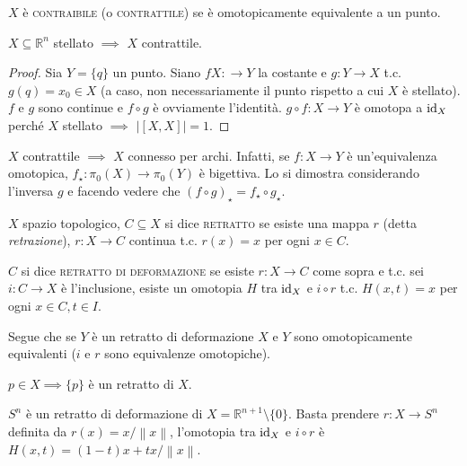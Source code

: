 \begin{defn}
  $X$ è \textsc{contraibile} (o \textsc{contrattile}) se è omotopicamente equivalente a un punto.
\end{defn}

\begin{prop}
  $X \subseteq \mathbb{R}^n$ stellato $\implies$ $X$ contrattile.
\end{prop}

\begin{proof}
  Sia $Y=\{q\}$ un punto. Siano $fX: \rightarrow Y$ la costante e $g:Y \rightarrow X$ t.c. $g(q)=x_0 \in X$ (a caso, non necessariamente il punto rispetto a cui $X$ è stellato). $f$ e $g$ sono continue e $f \circ g$ è ovviamente l'identità. $g \circ f:X \rightarrow Y$ è omotopa a $\operatorname{id}_X$ perché $X$ stellato $\implies$ $\left|[X, X]\right|=1$.
\end{proof}

\begin{oss}
  $X$ contrattile $\implies$ $X$ connesso per archi. Infatti, se $f:X \rightarrow Y$ è un'equivalenza omotopica, $f_{\star}: \pi_0(X) \rightarrow \pi_0(Y)$ è bigettiva. Lo si dimostra considerando l'inversa $g$ e facendo vedere che $(f \circ g)_{\star}=f_{\star} \circ g_{\star}$.
\end{oss}

\begin{defn}
  $X$ spazio topologico, $C \subseteq X$ si dice \textsc{retratto} se esiste una mappa $r$ (detta \textit{retrazione}), $r:X \rightarrow C$ continua t.c. $r(x)=x$ per ogni $x \in C$.

  $C$ si dice \textsc{retratto di deformazione} se esiste $r:X \rightarrow C$ come sopra e t.c. sei $i:C \rightarrow X$ è l'inclusione, esiste un omotopia $H$ tra $\operatorname{id}_X$ e $i \circ r$ t.c. $H(x, t)=x$ per ogni $x \in C, t \in I$.
\end{defn}

Segue che se $Y$ è un retratto di deformazione $X$ e $Y$ sono omotopicamente equivalenti ($i$ e $r$ sono equivalenze omotopiche).

\begin{ex}
  $p \in X \implies \{p\}$ è un retratto di $X$.
\end{ex}

\begin{ex}
  $S^n$ è un retratto di deformazione di $X=\mathbb{R}^{n+1} \setminus \{0\}$. Basta prendere $r: X \rightarrow S^n$ definita da $r(x)=x/\left\|x\right\|$, l'omotopia tra $\operatorname{id}_X$ e $i \circ r$ è $H(x, t)=(1-t)x+tx/\left\|x\right\|$.
\end{ex}

